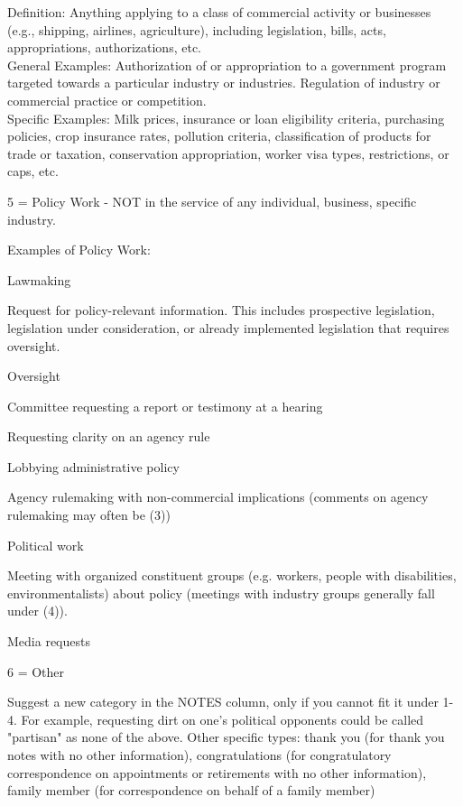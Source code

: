 \documentclass[12pt]{article}
\newenvironment{tight_itemize}{
\begin{itemize}
 \setlength{\itemsep}{0pt}
 \setlength{\parskip}{0pt}
 }{\end{itemize}}
\begin{document}
\hfill\begin{minipage}{\dimexpr\textwidth-2cm}
Definition: Anything applying to a class of commercial activity or businesses (e.g., shipping, airlines, agriculture), including legislation, bills, acts, appropriations, authorizations, etc. \\
General Examples: Authorization of or appropriation to a government program targeted towards a particular industry or industries. Regulation of industry or commercial practice or competition.\\
Specific Examples: Milk prices, insurance or loan eligibility criteria, purchasing policies, crop insurance rates, pollution criteria, classification of products for trade or taxation, conservation appropriation, worker visa types, restrictions, or caps, etc.\\
\end{minipage}
 
5 = Policy Work - NOT in the service of any individual, business, specific industry.\\

\hfill\begin{minipage}{\dimexpr\textwidth-2cm}
Examples of Policy Work: 
 \begin{tight_itemize} 
 \item Lawmaking 
\item Request for policy-relevant information. This includes prospective legislation, legislation under consideration, or already implemented legislation that requires oversight.  
\item Oversight
\item Committee requesting a report or testimony at a hearing
\item Requesting clarity on an agency rule
\item Lobbying administrative policy
\item Agency rulemaking with non-commercial implications (comments on agency rulemaking may often be (3)) 
\item Political work
\item Meeting with organized constituent groups (e.g. workers, people with disabilities, environmentalists) about policy (meetings with industry groups generally fall under (4)).
\item Media requests
 \end{tight_itemize} 
\end{minipage}
\bigskip


6 = Other \\

\hfill\begin{minipage}{\dimexpr\textwidth-2cm}
	Suggest a new category in the NOTES column, only if you cannot fit it under 1-4. For example, requesting dirt on one's political opponents could be called "partisan" as none of the above. Other specific types: thank you (for thank you notes with no other information), congratulations (for congratulatory correspondence on appointments or retirements with no other information), family member (for correspondence on behalf of a family member) \\
\end{minipage}
\end{document}
